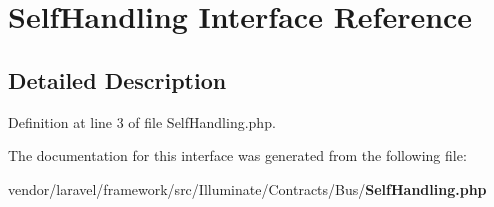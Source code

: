 \section{Self\+Handling Interface Reference}
\label{interface_illuminate_1_1_contracts_1_1_bus_1_1_self_handling}


\subsection{Detailed Description}


Definition at line 3 of file Self\+Handling.\+php.



The documentation for this interface was generated from the following file\+:\begin{DoxyCompactItemize}
\item 
vendor/laravel/framework/src/\+Illuminate/\+Contracts/\+Bus/{\bf Self\+Handling.\+php}\end{DoxyCompactItemize}
